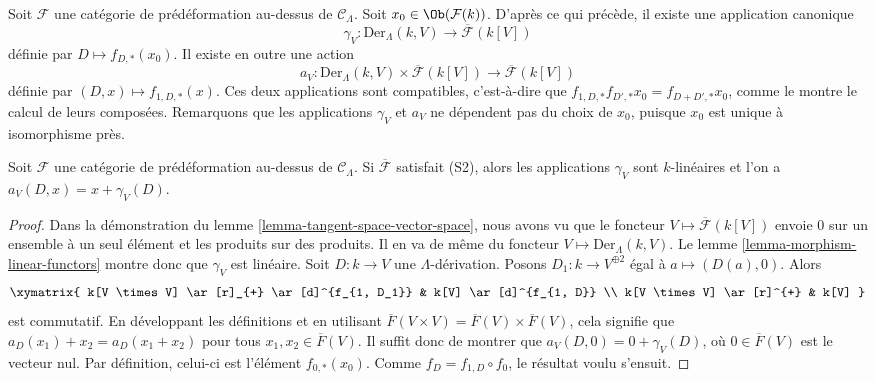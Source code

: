 \medskip\noindent
Soit $\mathcal{F}$ une catégorie de prédéformation au-dessus de
$\mathcal{C}_\Lambda$. Soit $x_0 \in \Ob(\mathcal{F}(k))$. D'après ce qui
précède, il existe une application canonique
$$
\gamma_V :
\text{Der}_\Lambda(k, V)
\longrightarrow
\overline{\mathcal{F}}(k[V])
$$
définie par $D \mapsto f_{D, *}(x_0)$. Il existe en outre une action
$$
a_V : \text{Der}_\Lambda(k, V) \times \overline{\mathcal{F}}(k[V])
\longrightarrow
\overline{\mathcal{F}}(k[V])
$$
définie par $(D, x) \mapsto f_{1, D, *}(x)$. Ces deux applications sont
compatibles, c'est-à-dire que
$f_{1, D, *}f_{D', *}x_0 = f_{D + D', *}x_0$, comme le montre le calcul de
leurs composées. Remarquons que les applications $\gamma_V$ et $a_V$ ne
dépendent pas du choix de $x_0$, puisque $x_0$ est unique à isomorphisme près.

\begin{lemma}
\label{lemma-action-linear}
Soit $\mathcal{F}$ une catégorie de prédéformation au-dessus de
$\mathcal{C}_\Lambda$. Si $\overline{\mathcal{F}}$ satisfait (S2), alors les
applications $\gamma_V$ sont $k$-linéaires et l'on a
$a_V(D, x) = x + \gamma_V(D)$.
\end{lemma}

\begin{proof}
Dans la démonstration du lemme \ref{lemma-tangent-space-vector-space}, nous
avons vu que le foncteur $V \mapsto \overline{\mathcal{F}}(k[V])$ envoie $0$
sur un ensemble à un seul élément et les produits sur des produits. Il en va de même du
foncteur $V \mapsto \text{Der}_\Lambda(k, V)$. Le lemme
\ref{lemma-morphism-linear-functors} montre donc que $\gamma_V$ est linéaire.
Soit $D : k \to V$ une $\Lambda$-dérivation. Posons
$D_1 : k \to V^{\oplus 2}$ égal à $a \mapsto (D(a), 0)$. Alors
$$
\xymatrix{
k[V \times V] \ar[r]_{+} \ar[d]^{f_{1, D_1}} & k[V] \ar[d]^{f_{1, D}} \\
k[V \times V] \ar[r]^{+} & k[V]
}
$$
est commutatif. En développant les définitions et en utilisant
$\overline{F}(V \times V) = \overline{F}(V) \times \overline{F}(V)$, cela
signifie que $a_D(x_1) + x_2 = a_D(x_1 + x_2)$ pour tous
$x_1, x_2 \in \overline{F}(V)$. Il suffit donc de montrer que
$a_V(D, 0) = 0 + \gamma_V(D)$, où $0 \in \overline{F}(V)$ est le vecteur
nul. Par définition, celui-ci est l'élément $f_{0, *}(x_0)$. Comme
$f_D = f_{1, D} \circ f_0$, le résultat voulu s'ensuit.
\end{proof}

